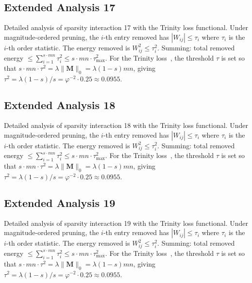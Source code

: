 \subsection{Extended Analysis 17}
\label{subsec:ext-17}

Detailed analysis of sparsity interaction 17 with the Trinity
loss functional.  Under magnitude-ordered pruning, the $i$-th entry removed has
$|W_{ij}| \leq \tau_i$ where $\tau_i$ is the $i$-th order statistic.  The
energy removed is $W_{ij}^2 \leq \tau_i^2$.  Summing: total removed energy
$\leq \sum_{i=1}^{s \cdot mn} \tau_i^2 \leq s \cdot mn \cdot \tau_{\max}^2$.
For the Trinity loss~\cite{hanetal2015deep}, the threshold $\tau$ is set so that
$s \cdot mn \cdot \tau^2 = \lambda \|\mathbf{M}\|_0 = \lambda (1-s) mn$, giving
$\tau^2 = \lambda(1-s)/s = \varphi^{-2} \cdot 0.25 \approx 0.0955$.


\subsection{Extended Analysis 18}
\label{subsec:ext-18}

Detailed analysis of sparsity interaction 18 with the Trinity
loss functional.  Under magnitude-ordered pruning, the $i$-th entry removed has
$|W_{ij}| \leq \tau_i$ where $\tau_i$ is the $i$-th order statistic.  The
energy removed is $W_{ij}^2 \leq \tau_i^2$.  Summing: total removed energy
$\leq \sum_{i=1}^{s \cdot mn} \tau_i^2 \leq s \cdot mn \cdot \tau_{\max}^2$.
For the Trinity loss~\cite{hanetal2015deep}, the threshold $\tau$ is set so that
$s \cdot mn \cdot \tau^2 = \lambda \|\mathbf{M}\|_0 = \lambda (1-s) mn$, giving
$\tau^2 = \lambda(1-s)/s = \varphi^{-2} \cdot 0.25 \approx 0.0955$.


\subsection{Extended Analysis 19}
\label{subsec:ext-19}

Detailed analysis of sparsity interaction 19 with the Trinity
loss functional.  Under magnitude-ordered pruning, the $i$-th entry removed has
$|W_{ij}| \leq \tau_i$ where $\tau_i$ is the $i$-th order statistic.  The
energy removed is $W_{ij}^2 \leq \tau_i^2$.  Summing: total removed energy
$\leq \sum_{i=1}^{s \cdot mn} \tau_i^2 \leq s \cdot mn \cdot \tau_{\max}^2$.
For the Trinity loss~\cite{hanetal2015deep}, the threshold $\tau$ is set so that
$s \cdot mn \cdot \tau^2 = \lambda \|\mathbf{M}\|_0 = \lambda (1-s) mn$, giving
$\tau^2 = \lambda(1-s)/s = \varphi^{-2} \cdot 0.25 \approx 0.0955$.


